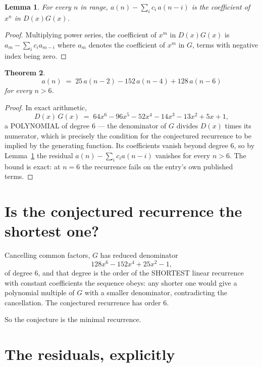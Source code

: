 \documentclass[11pt,a4paper]{article}
\theoremstyle{plain}
\newtheorem{theorem}{Theorem}
\newtheorem{lemma}[theorem]{Lemma}
\theoremstyle{definition}
\begin{document}
\begin{lemma}\label{lem:key}
For every $n$ in range, $a(n)-\sum_i c_i\,a(n-i)$ is the coefficient of $x^{n}$ in
$D(x)G(x)$.
\end{lemma}

\begin{proof}
Multiplying power series, the coefficient of $x^{m}$ in $D(x)G(x)$ is
$a_m-\sum_i c_i a_{m-i}$ where $a_m$ denotes the coefficient of $x^{m}$ in $G$, terms with
negative index being zero.
\end{proof}

\begin{theorem}
\[
a(n)\;=\;25\,a(n-2) - 152\,a(n-4) + 128\,a(n-6)
\]
for every $n>6$.
\end{theorem}

\begin{proof}
In exact arithmetic,
\[
D(x)\,G(x)\;=\;64 x^{6} - 96 x^{5} - 52 x^{4} - 14 x^{3} - 13 x^{2} + 5 x + 1,
\]
a POLYNOMIAL of degree $6$ --- the denominator of $G$ divides $D(x)$ times its numerator,
which is precisely the condition for the conjectured recurrence to be implied by the
generating function. Its coefficients vanish beyond degree $6$, so by
Lemma~\ref{lem:key} the residual $a(n)-\sum_ic_ia(n-i)$ vanishes for every
$n>6$. The bound is exact: at $n=6$ the recurrence fails on the entry's own published terms.
\end{proof}

\section{Is the conjectured recurrence the shortest one?}

Cancelling common factors, $G$ has reduced denominator
\[
128 x^{6} - 152 x^{4} + 25 x^{2} - 1,
\]
of degree $6$, and that degree is the order of the SHORTEST linear recurrence with
constant coefficients the sequence obeys: any shorter one would give a polynomial multiple of
$G$ with a smaller denominator, contradicting the cancellation. The conjectured recurrence has
order $6$.

So the conjecture is the minimal recurrence.

\section{The residuals, explicitly}
\end{document}
